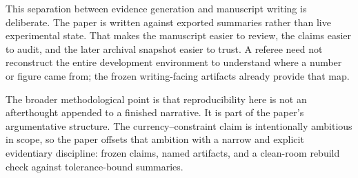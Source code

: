\documentclass[11pt,a4paper]{article}
\begin{document}
This separation between evidence generation and manuscript writing is deliberate. The paper is written against exported summaries rather than live experimental state. That makes the manuscript easier to review, the claims easier to audit, and the later archival snapshot easier to trust. A referee need not reconstruct the entire development environment to understand where a number or figure came from; the frozen writing-facing artifacts already provide that map.

The broader methodological point is that reproducibility here is not an afterthought appended to a finished narrative. It is part of the paper's argumentative structure. The currency--constraint claim is intentionally ambitious in scope, so the paper offsets that ambition with a narrow and explicit evidentiary discipline: frozen claims, named artifacts, and a clean-room rebuild check against tolerance-bound summaries.
 


\end{document}
